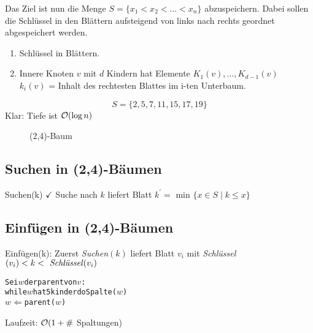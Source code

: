         Das Ziel ist nun die Menge $S = \{x_1 < x_2 < ... < x_n\}$ abzuspeichern. Dabei sollen die Schlüssel in den Blättern aufsteigend von links
        nach rechts geordnet abgespeichert werden.
        
        \begin{enumerate}[1.]
            \item Schlüssel in Blättern.
            \item Innere Knoten $v$ mit $d$ Kindern hat Elemente $K_1(v), \ldots, K_{d-1}(v)$ \\
            $k_i(v)$ = Inhalt des rechtesten Blattes im i-ten Unterbaum. 
        \end{enumerate}


        \begin{bsp}
            $$S=\{2,5,7,11,15,17,19 \}$$ 
            Klar: Tiefe ist $\mathcal{O}(\log n)$
            \begin{figure}
            	
            	\caption{(2,4)-Baum}
            \end{figure}
            
        \end{bsp}

        \subsection{Suchen in (2,4)-Bäumen}
            Suchen(k) $\checkmark$ \qquad Suche nach $k$ liefert Blatt $k^{'} = \text{ min }\{x \in S \mid k \leq x \}$ 
            
        \subsection{Einfügen in (2,4)-Bäumen}
            Einfügen(k): Zuerst \textit{Suchen}$(k)$ liefert Blatt $v_i$ mit \textit{Schlüssel} $(v_i) < k < \text{\textit{ Schlüssel}} (v_i) $ \\

        \begin{alltt}
            Sei \( w \) der parent von \( v \) : \\
            while \( w \) hat 5 kinder do Spalte(\( w \)) 
            \( w \) \( \Leftarrow \) parent(\( w \)) 
        \end{alltt}

        Laufzeit: $\mathcal{O}(1+ \#$ Spaltungen) \\
        
        
